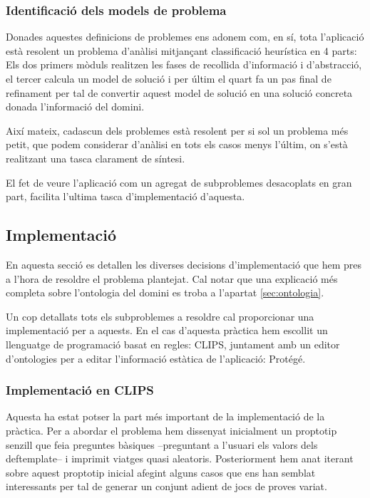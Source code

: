\documentclass[11pt,a4paper]{article}
\begin{document}
\subsubsection{Identificació dels models de problema}

Donades aquestes definicions de problemes ens adonem com, en sí, tota l'aplicació està resolent un problema d'anàlisi mitjançant classificació heurística en 4 parts: Els dos primers mòduls realitzen les fases de recollida d'informació i d'abstracció, el tercer calcula un model de solució i per últim el quart fa un pas final de refinament per tal de convertir aquest model de solució en una solució concreta donada l'informació del domini.

Així mateix, cadascun dels problemes està resolent per si sol un problema més petit, que podem considerar d'anàlisi en tots els casos menys l'últim, on s'està realitzant una tasca clarament de síntesi.

El fet de veure l'aplicació com un agregat de subproblemes desacoplats en gran part, facilita l'ultima tasca d'implementació d'aquesta.


\subsection{Implementació}
\label{sec:implementacio}
En aquesta secció es detallen les diverses decisions d'implementació que hem pres a l'hora de resoldre el problema plantejat. Cal notar que una explicació més completa sobre l'ontologia del domini es troba a l'apartat \ref{sec:ontologia}.

Un cop detallats tots els subproblemes a resoldre cal proporcionar una implementació per a aquests. En el cas d'aquesta pràctica hem escollit un llenguatge de programació basat en regles: CLIPS, juntament amb un editor d'ontologies per a editar l'informació estàtica de l'aplicació: Protégé.

\subsubsection{Implementació en CLIPS}
Aquesta ha estat potser la part més important de la implementació de la pràctica. Per a abordar el problema hem dissenyat inicialment un proptotip senzill que feia preguntes bàsiques --preguntant a l'usuari els valors dels deftemplate-- i imprimit viatges quasi aleatoris. Posteriorment hem anat iterant sobre aquest proptotip inicial afegint alguns casos que ens han semblat interessants per tal de generar un conjunt adient de jocs de proves variat.
\end{document}
